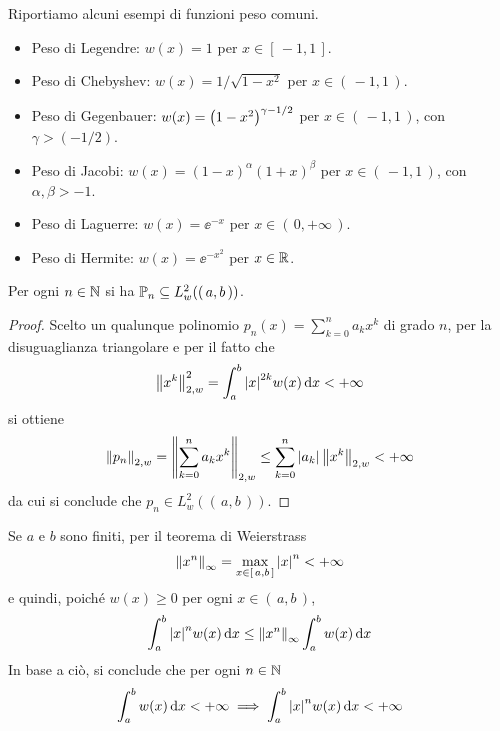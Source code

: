 	\begin{esempio}
		Riportiamo alcuni esempi di funzioni peso comuni.
			\begin{itemize}
				\item Peso di Legendre: \(w (x) = 1\) per \(x \in [\, -1, 1\,]\).
				\item Peso di Chebyshev: \(w (x) = 1 / \sqrt{1 - x^2}\) per \(x \in (\, -1, 1 \,)\).
				\item Peso di Gegenbauer: \(w (x) = \qty(1 - x^2)^{\gamma - 1 / 2}\) per \(x \in (\, -1, 1 \,)\), con \(\gamma > (- 1 / 2)\).
				\item Peso di Jacobi: \(w (x) = (1 - x)^\alpha (1 + x)^\beta\) per \(x \in (\, -1, 1 \,)\), con \(\alpha, \beta > - 1\).
				\item Peso di Laguerre: \(w (x) = \ee^{-x}\) per \(x \in (\, 0, + \infty \,)\).
				\item Peso di Hermite: \(w (x) = \ee^{- x^2}\) per \(x \in \R\).
			\end{itemize}
	\end{esempio}

	\begin{teorema}
		Per ogni \(n \in \N\) si ha \(\P_n \subseteq L_w^2 ((\, a, b \,))\).
	\end{teorema}

	\begin{proof}
		Scelto un qualunque polinomio \(p_n (x) = \sum_{k = 0}^n a_k x^k\) di grado \(n\), per la disuguaglianza triangolare e per il fatto che
		\begin{equation*}
			\norm{x^k}_{2, w}^2 = \int_a^b \abs{x}^{2 k} w (x) \dd{x} < + \infty
		\end{equation*}
		si ottiene
		\begin{equation*}
			\norm{p_n}_{2, w} = \norm{\sum_{k = 0}^n a_k x^k}_{2, w} \le \sum_{k = 0}^n \abs{a_k} \, \norm{x^k}_{2, w} < + \infty
		\end{equation*}
		da cui si conclude che \(p_n \in L_w^2 ((\, a, b \,))\).
	\end{proof}

	\begin{osservazione}
		Se \(a\) e \(b\) sono finiti, per il teorema di Weierstrass
		\begin{equation*}
			\norm{x^n}_\infty = \max_{x \in [\, a, b \,]} \abs{x}^n < + \infty
		\end{equation*}
		e quindi, poiché \(w (x) \ge 0\) per ogni \(x \in (\, a, b \,)\),
		\begin{equation*}
			\int_a^b \abs{x}^n w (x) \dd{x} \le \norm{x^n}_\infty \int_a^b w (x) \dd{x}
		\end{equation*}
		In base a ciò, si conclude che per ogni \(n \in \N\)
		\begin{equation}
			\int_a^b w (x) \dd{x} < + \infty \implies \int_a^b \abs{x}^n w (x) \dd{x} < + \infty
		\end{equation}
	\end{osservazione}

